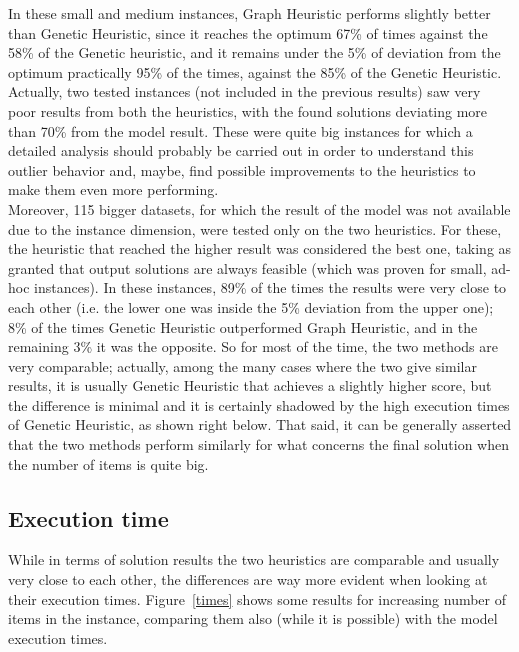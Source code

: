 \documentclass{article}
\begin{document}
In these small and medium instances, Graph Heuristic performs slightly better than Genetic Heuristic, since it reaches the optimum 67\% of times against the 58\% of the Genetic heuristic, and it remains under the 5\% of deviation from the optimum practically 95\% of the times, against the 85\% of the Genetic Heuristic.\\

Actually, two tested instances (not included in the previous results) saw very poor results from both the heuristics, with the found solutions deviating more than 70\% from the model result. These were quite big instances for which a detailed analysis should probably be carried out in order to understand this outlier behavior and, maybe, find possible improvements to the heuristics to make them even more performing. \\


Moreover, 115 bigger datasets, for which the result of the model was not available due to the instance dimension, were tested only on the two heuristics. For these, the heuristic that reached the higher result was considered the best one, taking as granted that output solutions are always feasible (which was proven for small, ad-hoc instances). In these instances, 89\% of the times the results were very close to each other (i.e. the lower one was inside the 5\% deviation from the upper one); 8\% of the times Genetic Heuristic outperformed Graph Heuristic, and in the remaining 3\% it was the opposite. So for most of the time, the two methods are very comparable; actually, among the many cases where the two give similar results, it is usually Genetic Heuristic that achieves a slightly higher score, but the difference is minimal and it is certainly shadowed by the high execution times of Genetic Heuristic, as shown right below. That said, it can be generally asserted that the two methods perform similarly for what concerns the final solution when the number of items is quite big.

\subsection{Execution time}
While in terms of solution results the two heuristics are comparable and usually very close to each other, the differences are way more evident when looking at their execution times. Figure~\ref{times} shows some results for increasing number of items in the instance, comparing them also (while it is possible) with the model execution times.\\
\end{document}
